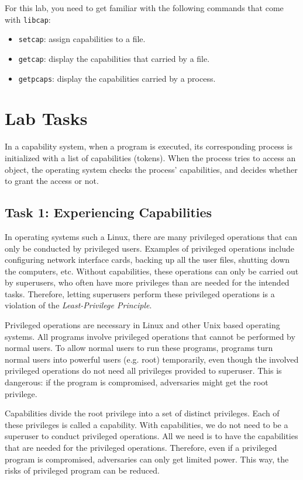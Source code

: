 \vspace{0.1in}
\noindent
For this lab, you need to get familiar with the
following commands that come with {\tt libcap}:
\begin{itemize}
\item {\tt setcap}:   assign capabilities to a file.
\item {\tt getcap}:   display the capabilities that carried by a file.
\item {\tt getpcaps}: display the capabilities carried by a process.
\end{itemize}

\section{Lab Tasks}

In a capability system, when a program is executed, its corresponding
process is initialized with a list of capabilities (tokens).
When the process tries to access an object,
the operating system checks the process' capabilities,
and decides whether to grant the access or not.


\subsection{Task 1: Experiencing Capabilities}

In operating systems such a Linux, there are many privileged operations that can
only be conducted by privileged users. Examples of privileged
operations include configuring network interface cards, backing
up all the user files, shutting down the computers, etc.
Without capabilities, these operations can only be carried out
by superusers, who often have more privileges than are
needed for the intended tasks. Therefore, letting superusers
perform these privileged operations is a violation of
the {\em Least-Privilege Principle}.

Privileged operations are necessary in Linux and other Unix based 
operating systems.
All \setuid programs involve privileged operations that cannot
be performed by normal users. To allow normal users to run
these programs, \setuid programs turn normal users into
powerful users (e.g. root) temporarily, even though 
the involved privileged operations do not need all privileges 
provided to superuser.
This is dangerous: if the program is compromised, adversaries
might get the root privilege.

Capabilities divide the root privilege into a set of
distinct privileges. Each of these privileges is called
a capability. With capabilities, we do not need to be a
superuser to conduct privileged operations.
All we need is to have the capabilities that are needed for
the privileged operations. Therefore, even if a privileged program
is compromised, adversaries can only get limited power. This
way, the risks of privileged program can be reduced.

